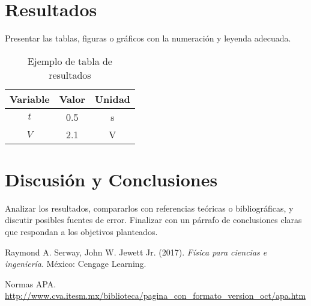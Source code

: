 \documentclass[12pt,a4paper]{article}
\begin{document}
\section{Resultados}
Presentar las tablas, figuras o gráficos con la numeración y leyenda adecuada.


\begin{table}[H]
\centering
\caption{Ejemplo de tabla de resultados}
\begin{tabular}{ccc}
\toprule
Variable & Valor & Unidad \\
\midrule
$t$ & 0.5 & s \\
$V$ & 2.1 & V \\
\bottomrule
\end{tabular}
\end{table}

\section{Discusión y Conclusiones}
Analizar los resultados, compararlos con referencias teóricas o bibliográficas, y discutir posibles fuentes de error.  
Finalizar con un párrafo de conclusiones claras que respondan a los objetivos planteados.

\begin{thebibliography}{9}
Raymond A. Serway, John W. Jewett Jr. (2017). \textit{Física para ciencias e ingeniería}. México: Cengage Learning.

Normas APA. \url{http://www.cva.itesm.mx/biblioteca/pagina_con_formato_version_oct/apa.htm}
\end{thebibliography}
\end{document}
